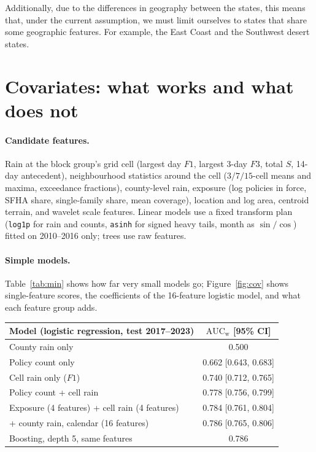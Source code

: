 \documentclass[11pt]{article}
\newcommand{\tc}[1]{\texttt{#1}}
\newcommand{\AUCw}{\mathrm{AUC}_{\mathrm{w}}}
\begin{document}
Additionally, due to the differences in geography between the states, this means that, under the current assumption, we must limit ourselves to states that share some geographic features. For example, the East Coast and the Southwest desert states.

\section{Covariates: what works and what does not}

\paragraph{Candidate features.}
Rain at the block group's grid cell (largest day $F1$, largest 3-day $F3$, total $S$, 14-day antecedent), neighbourhood statistics around the cell ($3/7/15$-cell means and maxima, exceedance fractions), county-level rain, exposure (log policies in force, SFHA share, single-family share, mean coverage), location and log area, centroid terrain, and wavelet scale features. Linear models use a fixed transform plan (\tc{log1p} for rain and counts, \tc{asinh} for signed heavy tails, month as $\sin/\cos$) fitted on 2010--2016 only; trees use raw features.

\paragraph{Simple models.}
Table~\ref{tab:min} shows how far very small models go; Figure~\ref{fig:cov} shows single-feature scores, the coefficients of the 16-feature logistic model, and what each feature group adds.

\begin{center}\small
\begin{tabular}{@{}lc@{}}
\toprule
Model (logistic regression, test 2017--2023) & $\AUCw$ [95\% CI] \\
\midrule
County rain only & 0.500 \\
Policy count only & 0.662 [0.643, 0.683] \\
Cell rain only ($F1$) & 0.740 [0.712, 0.765] \\
Policy count + cell rain & 0.778 [0.756, 0.799] \\
Exposure (4 features) + cell rain (4 features) & 0.784 [0.761, 0.804] \\
+ county rain, calendar (16 features) & 0.786 [0.765, 0.806] \\
Boosting, depth 5, same features & 0.786 \\
\bottomrule
\end{tabular}
\label{tab:min}
\end{center}
\end{document}
